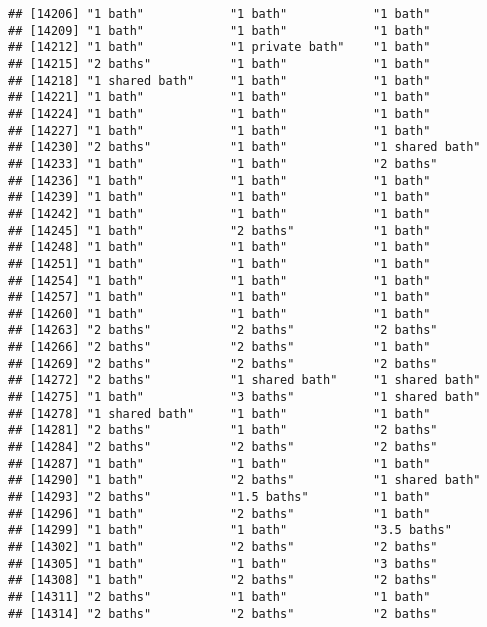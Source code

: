 \documentclass[
]{article}
\begin{document}
\begin{verbatim}
## [14206] "1 bath"            "1 bath"            "1 bath"           
## [14209] "1 bath"            "1 bath"            "1 bath"           
## [14212] "1 bath"            "1 private bath"    "1 bath"           
## [14215] "2 baths"           "1 bath"            "1 bath"           
## [14218] "1 shared bath"     "1 bath"            "1 bath"           
## [14221] "1 bath"            "1 bath"            "1 bath"           
## [14224] "1 bath"            "1 bath"            "1 bath"           
## [14227] "1 bath"            "1 bath"            "1 bath"           
## [14230] "2 baths"           "1 bath"            "1 shared bath"    
## [14233] "1 bath"            "1 bath"            "2 baths"          
## [14236] "1 bath"            "1 bath"            "1 bath"           
## [14239] "1 bath"            "1 bath"            "1 bath"           
## [14242] "1 bath"            "1 bath"            "1 bath"           
## [14245] "1 bath"            "2 baths"           "1 bath"           
## [14248] "1 bath"            "1 bath"            "1 bath"           
## [14251] "1 bath"            "1 bath"            "1 bath"           
## [14254] "1 bath"            "1 bath"            "1 bath"           
## [14257] "1 bath"            "1 bath"            "1 bath"           
## [14260] "1 bath"            "1 bath"            "1 bath"           
## [14263] "2 baths"           "2 baths"           "2 baths"          
## [14266] "2 baths"           "2 baths"           "1 bath"           
## [14269] "2 baths"           "2 baths"           "2 baths"          
## [14272] "2 baths"           "1 shared bath"     "1 shared bath"    
## [14275] "1 bath"            "3 baths"           "1 shared bath"    
## [14278] "1 shared bath"     "1 bath"            "1 bath"           
## [14281] "2 baths"           "1 bath"            "2 baths"          
## [14284] "2 baths"           "2 baths"           "2 baths"          
## [14287] "1 bath"            "1 bath"            "1 bath"           
## [14290] "1 bath"            "2 baths"           "1 shared bath"    
## [14293] "2 baths"           "1.5 baths"         "1 bath"           
## [14296] "1 bath"            "2 baths"           "1 bath"           
## [14299] "1 bath"            "1 bath"            "3.5 baths"        
## [14302] "1 bath"            "2 baths"           "2 baths"          
## [14305] "1 bath"            "1 bath"            "3 baths"          
## [14308] "1 bath"            "2 baths"           "2 baths"          
## [14311] "2 baths"           "1 bath"            "1 bath"           
## [14314] "2 baths"           "2 baths"           "2 baths"          

\end{verbatim}
\end{document}
